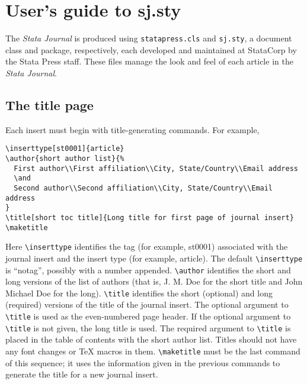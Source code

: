
\section{User's guide to sj.sty}

The {\sl Stata Journal\/} is produced using \texttt{statapress.cls} and
\texttt{sj.sty}, a {\LaTeXe} document class and package, respectively, each
developed and maintained at StataCorp by the Stata Press staff.  These files
manage the look and feel of each article in the {\sl Stata Journal}.

\subsection{The title page}

Each insert must begin with title-generating commands.  For example,

\begin{stverbatim}
\begin{verbatim}
\inserttype[st0001]{article}
\author{short author list}{%
  First author\\First affiliation\\City, State/Country\\Email address
  \and
  Second author\\Second affiliation\\City, State/Country\\Email address
}
\title[short toc title]{Long title for first page of journal insert}
\maketitle
\end{verbatim}
\end{stverbatim}

Here \verb+\inserttype+ identifies the tag (for example, st0001) associated
with the journal insert and the insert type (for example, article).  The default
\verb+\inserttype+ is ``notag'', possibly with a number appended.
\verb+\author+ identifies the short and long versions of the list of
authors (that is, J. M. Doe for the short title and John Michael Doe for the 
long).  \verb+\title+ identifies the short (optional) and long (required)
versions of the title of the journal insert.  The optional argument to
\verb+\title+ is used as the even-numbered page header.  If the optional
argument to \verb+\title+ is not given, the long title is used.  The required
argument to \verb+\title+ is placed in the table of contents with the short
author list.  Titles should not have any font changes or {\TeX} macros in
them.  \verb+\maketitle+ must be the last command of this sequence; it uses
the information given in the previous commands to generate the title for a new
journal insert.

